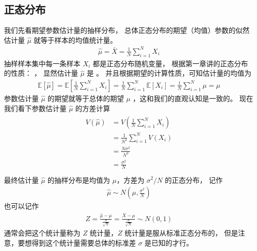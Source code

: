 \documentclass[letterpaper,10pt,english]{sphinxmanual}
\begin{document}
\subsection{正态分布}
\label{\detokenize{_u63a8_u65ad_u4e0e_u68c0_u9a8c/content:ch-sample-distribution-normal}}\label{\detokenize{_u63a8_u65ad_u4e0e_u68c0_u9a8c/content:id4}}
我们先看期望参数估计量的抽样分布，
总体正态分布的期望（均值）参数的似然估计量
\(\hat{\mu}\) 就等于样本的均值统计量。
\begin{equation}\label{equation:推断与检验/content:推断与检验/content:3}
\begin{split}\hat{\mu} = \bar{X} = \frac{1}{N} \sum_{i=1}^N X_i\end{split}
\end{equation}
抽样样本集中每一条样本 \(X_i\) 都是正态分布随机变量，
根据第一章讲的正态分布的性质：  ，
显然估计量 \(\hat{\mu}\) 是  。
并且根据期望的计算性质，可知估计量的均值为
\begin{equation}\label{equation:推断与检验/content:推断与检验/content:4}
\begin{split}\mathbb{E}[\hat{\mu}] =\mathbb{E}[ \frac{1}{N} \sum_{i=1}^N X_i ]
= \frac{1}{N} \sum_{i=1}^N \mathbb{E}[X_i]
= \frac{1}{N} \sum_{i=1}^N \mu
= \mu\end{split}
\end{equation}
参数估计量  \(\hat{\mu}\) 的期望就等于总体的期望 \(\mu\)
，这和我们的直观认知是一致的。
现在我们看下参数估计量  \(\hat{\mu}\) 的方差计算
\begin{align}\label{equation:推断与检验/content:推断与检验/content:5}\!\begin{aligned}
V(\hat{\mu}) &= V (\frac{1}{N} \sum_{i=1}^N X_i)\\
&= \frac{1}{N^2} \sum_{i=1}^N V(X_i)\\
&= \frac{N \sigma^2}{N^2}\\
&= \frac{\sigma^2}{N}\\
\end{aligned}\end{align}
最终估计量 \(\hat{\mu}\) 的抽样分布是均值为 \(\mu\)，方差为 \(\sigma^2/N\) 的正态分布，
记作
\begin{equation}\label{equation:推断与检验/content:推断与检验/content:6}
\begin{split}\hat{\mu} \sim N(\mu,\frac{\sigma^2}{N})\end{split}
\end{equation}
也可以记作
\begin{equation}\label{equation:推断与检验/content:eq_estimator_eval_015}
\begin{split}Z = \frac{\hat{\mu} - \mu}{ \frac{\sigma}{\sqrt{N} }}  =  \frac{\bar{X} - \mu}{ \frac{\sigma}{\sqrt{N} }} \sim N(0,1)\end{split}
\end{equation}
通常会把这个统计量称为 \(Z\) 统计量，\(Z\) 统计量是服从标准正态分布的，
但是注意，要想得到这个统计量需要总体的标准差 \(\sigma\) 是已知的才行。
\end{document}
